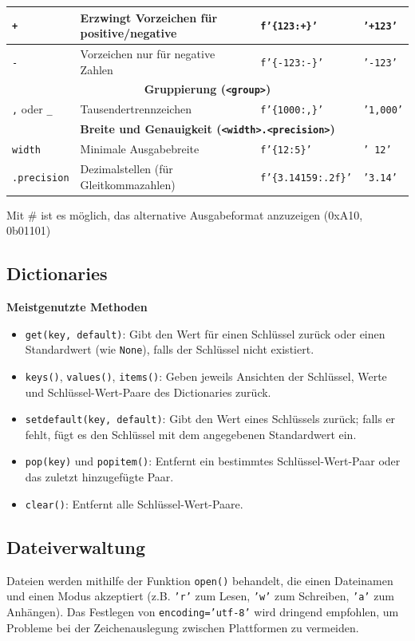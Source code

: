 {\begin{tabular}{|l|l|l|l|}
\hline
\texttt{+} & Erzwingt Vorzeichen für positive/negative & \texttt{f'\{123:+\}'} & \texttt{'+123'} \\
\hline
\texttt{-} & Vorzeichen nur für negative Zahlen & \texttt{f'\{-123:-\}'} & \texttt{'-123'} \\
\hline
\multicolumn{4}{|c|}{\textbf{Gruppierung (\texttt{<group>})}} \\
\hline
\texttt{,} oder \texttt{\_} & Tausendertrennzeichen & \texttt{f'\{1000:,\}'} & \texttt{'1,000'} \\
\hline
\multicolumn{4}{|c|}{\textbf{Breite und Genauigkeit (\texttt{<width>.<precision>})}} \\
\hline
\texttt{width} & Minimale Ausgabebreite & \texttt{f'\{12:5\}'} & \texttt{'   12'} \\
\hline
\texttt{.precision} & Dezimalstellen (für Gleitkommazahlen) & \texttt{f'\{3.14159:.2f\}'} & \texttt{'3.14'} \\
\hline
\end{tabular}}\vspace{1em}

Mit \# ist es möglich, das alternative Ausgabeformat anzuzeigen (0xA10, 0b01101)

\subsection{Dictionaries}
\textbf{Meistgenutzte Methoden}
\begin{itemize}
    \item \texttt{get(key, default)}: Gibt den Wert für einen Schlüssel zurück oder einen Standardwert (wie \texttt{None}), falls der Schlüssel nicht existiert.
    \item \texttt{keys()}, \texttt{values()}, \texttt{items()}: Geben jeweils Ansichten der Schlüssel, Werte und Schlüssel-Wert-Paare des Dictionaries zurück.
    \item \texttt{setdefault(key, default)}: Gibt den Wert eines Schlüssels zurück; falls er fehlt, fügt es den Schlüssel mit dem angegebenen Standardwert ein.
    \item \texttt{pop(key)} und \texttt{popitem()}: Entfernt ein bestimmtes Schlüssel-Wert-Paar oder das zuletzt hinzugefügte Paar.
    \item \texttt{clear()}: Entfernt alle Schlüssel-Wert-Paare.
\end{itemize}

\subsection{Dateiverwaltung}
Dateien werden mithilfe der Funktion \texttt{open()} behandelt, die einen Dateinamen und einen Modus akzeptiert (z.B. \texttt{'r'} zum Lesen, \texttt{'w'} zum Schreiben, \texttt{'a'} zum Anhängen). Das Festlegen von \texttt{encoding='utf-8'} wird dringend empfohlen, um Probleme bei der Zeichenauslegung zwischen Plattformen zu vermeiden. 

